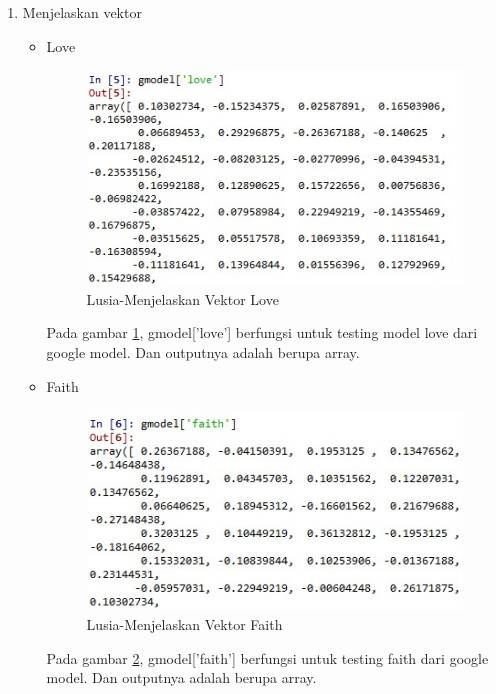 \begin{enumerate}
\begin{enumerate}
		\item Menjelaskan vektor
			\begin{itemize}
				\item Love
					\begin{figure}[ht]
					\centering
					\includegraphics[scale=0.45]{figures/chap5a.jpg}
					\caption{Lusia-Menjelaskan Vektor Love}
					\label{5b2}
					\end{figure}
					\par Pada gambar \ref{5b2}, gmodel['love'] berfungsi untuk testing model love dari google model. Dan outputnya adalah berupa array. 
					
				\item Faith
					\begin{figure}[ht]
					\centering
					\includegraphics[scale=0.45]{figures/chap5b.jpg}
					\caption{Lusia-Menjelaskan Vektor Faith}
					\label{5b3}
					\end{figure}
					\par Pada gambar \ref{5b3}, gmodel['faith'] berfungsi untuk testing faith dari google model. Dan outputnya adalah berupa array. 
					

\end{itemize}
\end{enumerate}
\end{enumerate}
